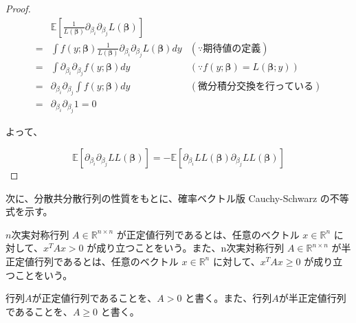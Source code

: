 \begin{proof}
    \begin{equation}
        \begin{aligned}
              & \mathbb{E}\left[\frac{1}{L(\bm{\beta})}\partial_{\beta_i}\partial_{\beta_j} L(\bm{\beta})\right]                                              \\
            = & \int f(y;\bm{\beta})\frac{1}{L(\bm{\beta})}\partial_{\beta_i}\partial_{\beta_j} L(\bm{\beta})dy  & (\because 期待値の定義)                          \\
            = & \int \partial_{\beta_i}\partial_{\beta_j} f(y;\bm{\beta})dy                                      & (\because f(y;\bm{\beta})=L(\bm{\beta};y)) \\
            = & \partial_{\beta_i}\partial_{\beta_j} \int f(y;\bm{\beta})dy                                      & (微分積分交換を行っている)                             \\
            = & \partial_{\beta_i}\partial_{\beta_j} 1 = 0
        \end{aligned}
    \end{equation}
    
    よって、
    
    \begin{equation}
        \mathbb{E}\left[\partial_{\beta_i}\partial_{\beta_j} LL(\bm{\beta})\right] = -\mathbb{E}\left[\partial_{\beta_i}LL(\bm{\beta}) \partial_{\beta_j} LL(\bm{\beta})\right]
    \end{equation}
\end{proof}

次に、分散共分散行列の性質をもとに、確率ベクトル版 Cauchy-Schwarz の不等式を示す。

\begin{definition}
    \label{def:positive_definite}
    $n$次実対称行列 $A\in\mathbb{R}^{n \times n}$ が正定値行列であるとは、任意のベクトル $x\in\mathbb{R}^n$ に対して、$x^TAx > 0$ が成り立つことをいう。また、n次実対称行列 $A\in\mathbb{R}^{n \times n}$ が半正定値行列であるとは、任意のベクトル $x\in\mathbb{R}^n$ に対して、$x^TAx \ge 0$ が成り立つことをいう。
\end{definition}

行列$A$が正定値行列であることを、$A>0$ と書く。また、行列$A$が半正定値行列であることを、$A\ge 0$ と書く。

